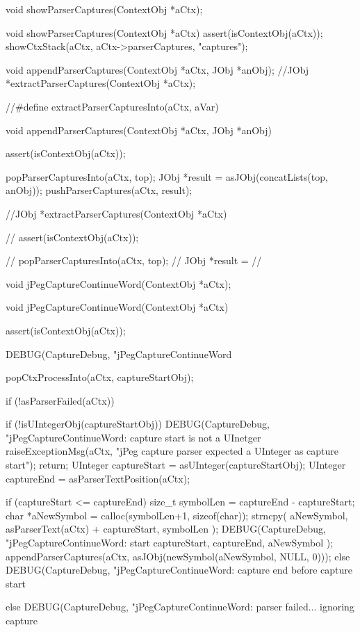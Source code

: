 \startCHeader
void showParserCaptures(ContextObj *aCtx);
\stopCHeader

\startCCode
void showParserCaptures(ContextObj *aCtx) {
  assert(isContextObj(aCtx));
  showCtxStack(aCtx, aCtx->parserCaptures, "captures");
}
\stopCCode

\startCHeader
void appendParserCaptures(ContextObj *aCtx, JObj *anObj);
//JObj *extractParserCaptures(ContextObj *aCtx);

//#define extractParserCapturesInto(aCtx, aVar) 
\stopCHeader

\startCCode
void appendParserCaptures(ContextObj *aCtx, JObj *anObj) {
  assert(isContextObj(aCtx));
  
  popParserCapturesInto(aCtx, top);
  JObj *result =
    asJObj(concatLists(top, anObj));
  pushParserCaptures(aCtx, result);
}

//JObj *extractParserCaptures(ContextObj *aCtx) {
//  assert(isContextObj(aCtx));
  
//  popParserCapturesInto(aCtx, top);
//  JObj *result = 
//}
\stopCCode

\startCHeader
void jPegCaptureContinueWord(ContextObj *aCtx);
\stopCHeader

\startCCode
void jPegCaptureContinueWord(ContextObj *aCtx){
  assert(isContextObj(aCtx));
  
  DEBUG(CaptureDebug, "jPegCaptureContinueWord%
  
  popCtxProcessInto(aCtx, captureStartObj);
  
  if (!asParserFailed(aCtx)) {
    if (!isUIntegerObj(captureStartObj)) {
      DEBUG(CaptureDebug,
        "jPegCaptureContinueWord: capture start is not a UInetger%
      raiseExceptionMsg(aCtx,
        "jPeg capture parser expected a UInteger as capture start");
      return;
    }
    UInteger captureStart = asUInteger(captureStartObj);
    UInteger captureEnd   = asParserTextPosition(aCtx);
    
    if (captureStart <= captureEnd) {
      size_t symbolLen = captureEnd - captureStart;
      char *aNewSymbol = calloc(symbolLen+1, sizeof(char));
      strncpy(
        aNewSymbol,
        asParserText(aCtx) + captureStart,
        symbolLen
      );
      DEBUG(CaptureDebug,
        "jPegCaptureContinueWord: start %
        captureStart, captureEnd, aNewSymbol
      );
      appendParserCaptures(aCtx,
        asJObj(newSymbol(aNewSymbol, NULL, 0)));
    } else {
      DEBUG(CaptureDebug,
        "jPegCaptureContinueWord: capture end before capture start%
    }
  } else {
    DEBUG(CaptureDebug,
      "jPegCaptureContinueWord: parser failed... ignoring capture%
  }
  
}
\stopCCode

